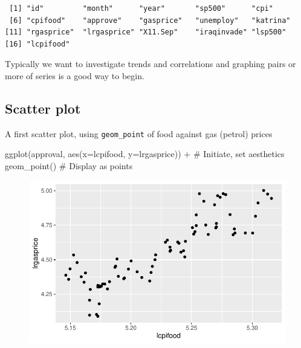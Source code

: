 \documentclass[
  letterpaper,
]{book}
\newenvironment{Shaded}{\begin{snugshade}}{\end{snugshade}}
\newcommand{\AttributeTok}[1]{\textcolor[rgb]{0.40,0.45,0.13}{#1}}
\newcommand{\CommentTok}[1]{\textcolor[rgb]{0.37,0.37,0.37}{#1}}
\newcommand{\FunctionTok}[1]{\textcolor[rgb]{0.28,0.35,0.67}{#1}}
\newcommand{\NormalTok}[1]{\textcolor[rgb]{0.00,0.23,0.31}{#1}}
\newcommand{\SpecialCharTok}[1]{\textcolor[rgb]{0.37,0.37,0.37}{#1}}
\begin{document}
\begin{verbatim}
 [1] "id"         "month"      "year"       "sp500"      "cpi"       
 [6] "cpifood"    "approve"    "gasprice"   "unemploy"   "katrina"   
[11] "rgasprice"  "lrgasprice" "X11.Sep"    "iraqinvade" "lsp500"    
[16] "lcpifood"  
\end{verbatim}

Typically we want to investigate trends and correlations and graphing
pairs or more of series is a good way to begin.

\hypertarget{scatter-plot}{%
\subsection{Scatter plot}\label{scatter-plot}}

A first scatter plot, using \texttt{geom\_point} of food against gas
(petrol) prices

\begin{Shaded}
\begin{Highlighting}[]
\FunctionTok{ggplot}\NormalTok{(approval, }\FunctionTok{aes}\NormalTok{(}\AttributeTok{x=}\NormalTok{lcpifood, }\AttributeTok{y=}\NormalTok{lrgasprice)) }\SpecialCharTok{+}    \CommentTok{\# Initiate, set aesthetics}
  \FunctionTok{geom\_point}\NormalTok{()                                       }\CommentTok{\# Display as points}
\end{Highlighting}
\end{Shaded}

\begin{figure}[H]

{\centering \includegraphics{Appendix1_files/figure-pdf/p1-1.pdf}

}

\end{figure}
\end{document}
